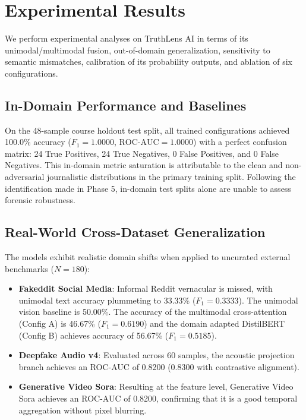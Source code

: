 \documentclass[conference]{IEEEtran}
\begin{document}
\section{Experimental Results}
We perform experimental analyses on TruthLens AI in terms of its unimodal/multimodal fusion, out-of-domain generalization, sensitivity to semantic mismatches, calibration of its probability outputs, and ablation of six configurations.

\subsection{In-Domain Performance and Baselines}
On the 48-sample course holdout test split, all trained configurations achieved 100.0\% accuracy ($F_1 = 1.0000$, $\text{ROC-AUC} = 1.0000$) with a perfect confusion matrix: 24 True Positives, 24 True Negatives, 0 False Positives, and 0 False Negatives. This in-domain metric saturation is attributable to the clean and non-adversarial journalistic distributions in the primary training split. Following the identification made in Phase 5, in-domain test splits alone are unable to assess forensic robustness.

\subsection{Real-World Cross-Dataset Generalization}
The models exhibit realistic domain shifts when applied to uncurated external benchmarks ($N = 180$):
\begin{itemize}
    \item \textbf{Fakeddit Social Media}: Informal Reddit vernacular is missed, with unimodal text accuracy plummeting to 33.33\% ($F_1 = 0.3333$). The unimodal vision baseline is 50.00\%. The accuracy of the multimodal cross-attention (Config A) is 46.67\% ($F_1 = 0.6190$) and the domain adapted DistilBERT (Config B) achieves accuracy of 56.67\% ($F_1 = 0.5185$).
    \item \textbf{Deepfake Audio v4}: Evaluated across 60 samples, the acoustic projection branch achieves an ROC-AUC of 0.8200 (0.8300 with contrastive alignment).
    \item \textbf{Generative Video Sora}: Resulting at the feature level, Generative Video Sora achieves an ROC-AUC of 0.8200, confirming that it is a good temporal aggregation without pixel blurring.
\end{itemize}
\end{document}
